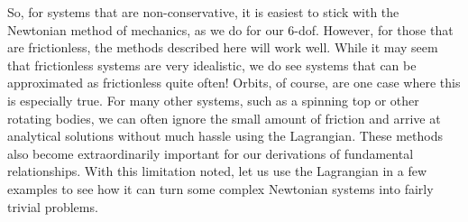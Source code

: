 \documentclass[10pt, openany, titlepage]{book}
\theoremstyle{definition}
\newcounter{example}[chapter]
\begin{document}
So, for systems that are non-conservative, it is easiest to stick with the Newtonian method of mechanics, as we do for our 6-\gls{dof}. However, for those that are frictionless, the methods described here will work well. While it may seem that frictionless systems are very idealistic, we do see systems that can be approximated as frictionless quite often! Orbits, of course, are one case where this is especially true. For many other systems, such as a spinning top or other rotating bodies, we can often ignore the small amount of friction and arrive at analytical solutions without much hassle using the \gls{Lagrangian}. These methods also become extraordinarily important for our derivations of fundamental relationships. With this limitation noted, let us use the \gls{Lagrangian} in a few examples to see how it can turn some complex Newtonian systems into fairly trivial problems.
\end{document}
